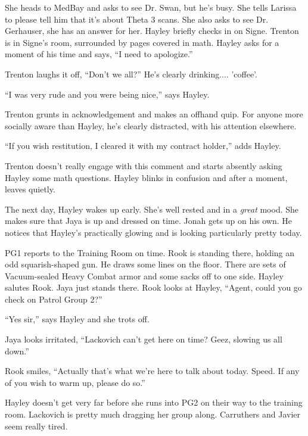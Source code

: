 She heads to MedBay and asks to see Dr. Swan, but he's busy. She tells Larissa to please tell him that it's about Theta 3 scans.  She also asks to see Dr. Gerhauser, she has an answer for her.  Hayley briefly checks in on Signe.  Trenton is in Signe's room, surrounded by pages covered in math.  Hayley asks for a moment of his time and says, ``I need to apologize.''

Trenton laughs it off, ``Don't we all?''   He's clearly drinking.... 'coffee'.

``I was very rude and you were being nice,'' says Hayley.

Trenton grunts in acknowledgement and makes an offhand quip.  For anyone more socially aware than Hayley, he's clearly distracted, with his attention elsewhere.

``If you wish restitution, I cleared it with my contract holder,'' adds Hayley.

Trenton doesn't really engage with this comment and starts absently asking Hayley some math questions.  Hayley blinks in confusion and after a moment, leaves quietly.





The next day, Hayley wakes up early. She's well rested and in a \textit{great} mood.  She makes sure that Jaya is up and dressed on time.  Jonah gets up on his own.  He notices that Hayley's practically glowing and is looking particularly pretty today.



PG1 reports to the Training Room on time.  Rook is standing there, holding an odd squarish-shaped gun.  He draws some lines on the floor.  There are sets of Vacuum-sealed Heavy Combat armor and some sacks off to one side.  Hayley salutes Rook. Jaya just stands there.  Rook looks at Hayley, ``Agent, could you go check on Patrol Group 2?''

``Yes sir,'' says Hayley and she trots off.

Jaya looks irritated, ``Lackovich can't get here on time?  Geez, slowing us all down.''

Rook smiles, ``Actually that's what we're here to talk about today.  Speed.  If any of you wish to warm up, please do so.''



Hayley doesn't get very far before she runs into PG2 on their way to the training room.  Lackovich is pretty much dragging her group along.  Carruthers and Javier seem really tired.


